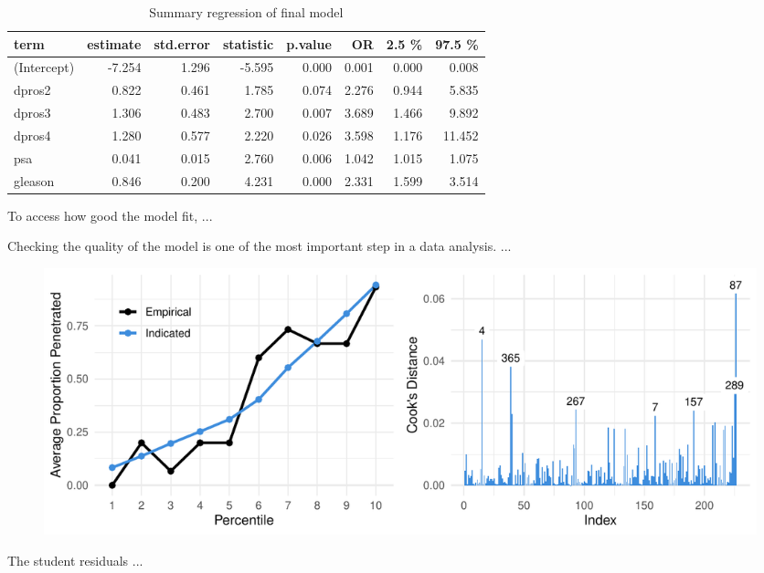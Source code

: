 \documentclass[11pt]{article}\usepackage[]{graphicx}\usepackage[]{color}
\makeatletter
\def\maxwidth{ %
  \ifdim\Gin@nat@width>\linewidth
    \linewidth
  \else
    \Gin@nat@width
  \fi
}
\makeatother
\begin{document}
\begin{center}
\begin{table}[ht]
\centering
\begin{tabular}{lrrrrrrr}
  \hline
term & estimate & std.error & statistic & p.value & OR & 2.5 \% & 97.5 \% \\ 
  \hline
(Intercept) & -7.254 & 1.296 & -5.595 & 0.000 & 0.001 & 0.000 & 0.008 \\ 
  dpros2 & 0.822 & 0.461 & 1.785 & 0.074 & 2.276 & 0.944 & 5.835 \\ 
  dpros3 & 1.306 & 0.483 & 2.700 & 0.007 & 3.689 & 1.466 & 9.892 \\ 
  dpros4 & 1.280 & 0.577 & 2.220 & 0.026 & 3.598 & 1.176 & 11.452 \\ 
  psa & 0.041 & 0.015 & 2.760 & 0.006 & 1.042 & 1.015 & 1.075 \\ 
  gleason & 0.846 & 0.200 & 4.231 & 0.000 & 2.331 & 1.599 & 3.514 \\ 
   \hline
\end{tabular}
\caption{Summary regression of final model} 
\label{reg_summary_final}
\end{table}

\end{center}

\noindent To access how good the model fit, ...
\hfill \break

\noindent Checking the quality of the model is one of the most important step in a data analysis. ...
\hfill \break


\begin{figure}[h!] 
\begin{center}

\includegraphics[width=\maxwidth]{figure/unnamed-chunk-4-1} 

\caption{}
\label{model_plot_1}
\end{center} 
\end{figure}

\noindent The student residuals ...  
\hfill \break
\end{document}
